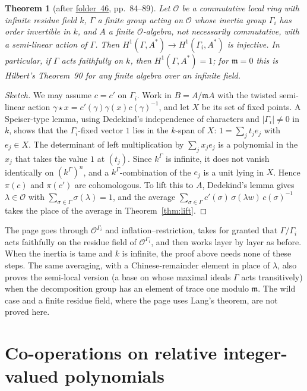 \documentclass[11pt,a4paper]{amsart}
\newtheorem{theorem}{Theorem}[section]
\theoremstyle{definition}
\theoremstyle{remark}
\newcommand{\cO}{\mathcal O}
\newcommand{\fac}[1]{\href{https://grothendieck.umontpellier.fr/#1.pdf}{folder~#1}}
\begin{document}
\begin{theorem}[after \fac{46}, pp.~84--89]\label{thm:inertia}
Let $\cO$ be a commutative local ring with infinite residue field $k$, $\Gamma$ a finite group acting on $\cO$ whose inertia group $\Gamma_i$ has order invertible in $k$, and $A$ a finite $\cO$-algebra, not necessarily commutative, with a semi-linear action of $\Gamma$. Then $H^1(\Gamma, A^*) \to H^1(\Gamma_i, A^*)$ is injective. In particular, if $\Gamma$ acts faithfully on $k$, then $H^1(\Gamma, A^*) = 1$; for $\mathfrak m = 0$ this is Hilbert's Theorem~90 for any finite algebra over an infinite field.
\end{theorem}

\begin{proof}[Sketch]
We may assume $c = c'$ on $\Gamma_i$. Work in $B = A/\mathfrak mA$ with the twisted semi-linear action $\gamma\star x = c'(\gamma)\gamma(x)c(\gamma)^{-1}$, and let $X$ be its set of fixed points. A Speiser-type lemma, using Dedekind's independence of characters and $|\Gamma_i| \ne 0$ in $k$, shows that the $\Gamma_i$-fixed vector $1$ lies in the $k$-span of $X$: $1 = \sum_j t_je_j$ with $e_j \in X$. The determinant of left multiplication by $\sum_j x_je_j$ is a polynomial in the $x_j$ that takes the value $1$ at $(t_j)$. Since $k^\Gamma$ is infinite, it does not vanish identically on $(k^\Gamma)^n$, and a $k^\Gamma$-combination of the $e_j$ is a unit lying in $X$. Hence $\pi(c)$ and $\pi(c')$ are cohomologous. To lift this to $A$, Dedekind's lemma gives $\lambda \in \cO$ with $\sum_{\sigma\in\Gamma}\sigma(\lambda) = 1$, and the average $\sum_{\sigma\in\Gamma}c'(\sigma)\,\sigma(\lambda w)\,c(\sigma)^{-1}$ takes the place of the average in Theorem~\ref{thm:lift}.
\end{proof}

The page goes through $\cO^{\Gamma_i}$ and inflation--restriction, takes for granted that $\Gamma/\Gamma_i$ acts faithfully on the residue field of $\cO^{\Gamma_i}$, and then works layer by layer as before. When the inertia is tame and $k$ is infinite, the proof above needs none of these steps. The same averaging, with a Chinese-remainder element in place of $\lambda$, also proves the semi-local version (a base on whose maximal ideals $\Gamma$ acts transitively) when the decomposition group has an element of trace one modulo $\mathfrak m$. The wild case and a finite residue field, where the page uses Lang's theorem, are not proved here.

\section{Co-operations on relative integer-valued polynomials}\label{sec:int}
\end{document}
